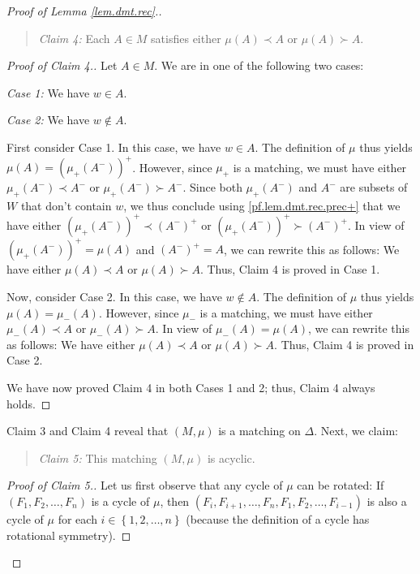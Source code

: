\documentclass[12pt]{amsart}
\theoremstyle{definition}
\newenvironment{statement}{\begin{quote}}{\end{quote}}
\begin{document}
\begin{proof}[Proof of Lemma \ref{lem.dmt.rec}.]
\begin{statement}
\textit{Claim 4:} Each $A\in M$ satisfies either $\mu\left(  A\right)  \prec
A$ or $\mu\left(  A\right)  \succ A$.
\end{statement}

\begin{proof}
[Proof of Claim 4.]Let $A\in M$. We are in one of the following two cases:

\textit{Case 1:} We have $w\in A$.

\textit{Case 2:} We have $w\notin A$.

First consider Case 1. In this case, we have $w\in A$. The definition of $\mu$
thus yields $\mu\left(  A\right)  =\left(  \mu_+\left(  A^-\right)
\right)  ^+$. However, since $\mu_+$ is a matching, we must have either
$\mu_+\left(  A^-\right)  \prec A^-$ or $\mu_+\left(  A^-\right)
\succ A^-$. Since both $\mu_+\left(  A^-\right)  $ and $A^-$ are
subsets of $W$ that don't contain $w$, we thus conclude using
\eqref{pf.lem.dmt.rec.prec+} that we have either $\left(  \mu_+\left(
A^-\right)  \right)  ^+\prec\left(  A^-\right)  ^+$ or $\left(
\mu_+\left(  A^-\right)  \right)  ^+\succ\left(  A^-\right)  ^+$. In
view of $\left(  \mu_+\left(  A^-\right)  \right)  ^+=\mu\left(
A\right)  $ and $\left(  A^-\right)  ^+=A$, we can rewrite this as
follows: We have either $\mu\left(  A\right)  \prec A$ or $\mu\left(
A\right)  \succ A$. Thus, Claim 4 is proved in Case 1.

Now, consider Case 2. In this case, we have $w\notin A$. The definition of
$\mu$ thus yields $\mu\left(  A\right)  =\mu_-\left(  A\right)  $. However,
since $\mu_-$ is a matching, we must have either $\mu_-\left(  A\right)
\prec A$ or $\mu_-\left(  A\right)  \succ A$. In view of $\mu_-\left(
A\right)  =\mu\left(  A\right)  $, we can rewrite this as follows: We have
either $\mu\left(  A\right)  \prec A$ or $\mu\left(  A\right)  \succ A$. Thus,
Claim 4 is proved in Case 2.

We have now proved Claim 4 in both Cases 1 and 2; thus, Claim 4 always holds.
\end{proof}

Claim 3 and Claim 4 reveal that $\left(  M,\mu\right)  $ is a matching on
$\Delta$. Next, we claim:

\begin{statement}
\textit{Claim 5:} This matching $\left(  M,\mu\right)  $ is acyclic.
\end{statement}

\begin{proof}
[Proof of Claim 5.]Let us first observe that any cycle of $\mu$ can be
rotated: If $\left(  F_{1},F_{2},\ldots,F_{n}\right)  $ is a cycle of $\mu$,
then $\left(  F_{i},F_{i+1},\ldots,F_{n},F_{1},F_{2},\ldots,F_{i-1}\right)  $
is also a cycle of $\mu$ for each $i\in\left\{  1,2,\ldots,n\right\}  $
(because the definition of a cycle has rotational symmetry).


\end{proof}
\end{proof}
\end{document}
